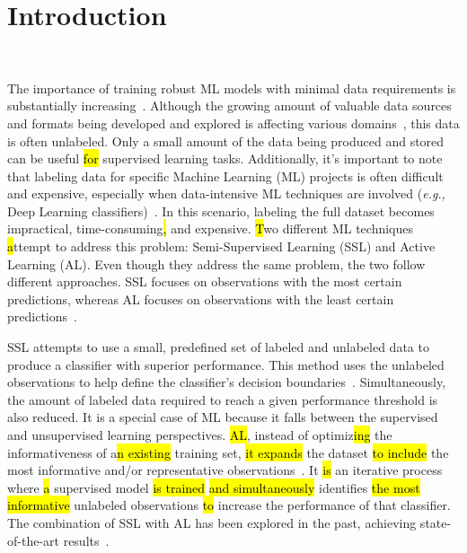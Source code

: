 \documentclass[preprint, 12pt]{elsarticle}
\begin{document}
\linenumbers%

\section{Introduction}~\label{sec:introduction}


The importance of training robust ML models with minimal data requirements is
substantially increasing~\cite{Nath2021, Sverchkov2017, Li2012}. Although the
growing amount of valuable data sources and formats being developed and
explored is affecting various domains~\cite{Li2021}, this data is often
unlabeled. Only a small amount of the data being produced and stored can be
useful \hl{for} supervised learning tasks. Additionally, it's important to note that
labeling data for specific Machine Learning (ML) projects is often difficult
and expensive, especially when data-intensive ML techniques are involved
(\textit{e.g.,} Deep Learning classifiers)~\cite{Nath2021}. In this scenario,
labeling the full dataset becomes impractical, time-consuming\hl{,} and expensive.
\hl{T}wo different ML techniques\hl{ a}ttempt to address this problem:
Semi-Supervised Learning (SSL) and Active Learning (AL). Even though they
address the same problem, the two follow different approaches. SSL focuses on
observations with the most certain predictions, whereas AL focuses on
observations with the least certain predictions~\cite{Simeoni2020}.

SSL attempts to use a small, predefined set of labeled and unlabeled data to
produce a classifier with superior performance. This method uses the unlabeled
observations to help define the classifier's decision
boundaries~\cite{Van2020}. Simultaneously, the amount of labeled data required
to reach a given performance threshold is also reduced. It is a special case
of ML because it falls between the supervised and unsupervised learning
perspectives. \hl{AL}, instead of optimiz\hl{ing} the informativeness of
a\hl{n existing} training set, \hl{it expands} the dataset \hl{to include} the
most informative and/or representative observations~\cite{Sener2018}. It
\hl{is} an iterative process where \hl{a} supervised model \hl{is trained}
\hl{and simultaneously} identifies \hl{the most informative} unlabeled
observations\hl{ to} increase the performance of that classifier. The
combination of SSL with AL has been explored in the past, achieving
state-of-the-art results~\cite{Leng2013}.
 
\end{document}
